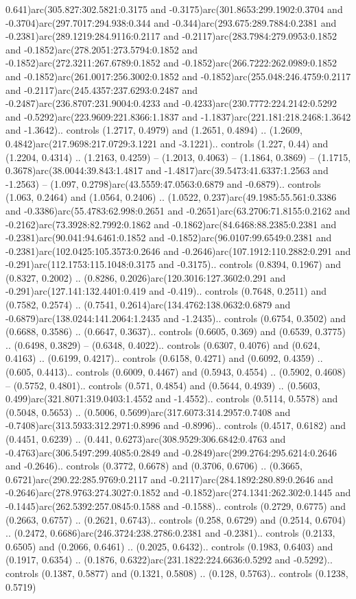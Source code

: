 0.641)arc(305.827:302.5821:0.3175 and -0.3175)arc(301.8653:299.1902:0.3704 and -0.3704)arc(297.7017:294.938:0.344 and -0.344)arc(293.675:289.7884:0.2381 and -0.2381)arc(289.1219:284.9116:0.2117 and -0.2117)arc(283.7984:279.0953:0.1852 and -0.1852)arc(278.2051:273.5794:0.1852 and -0.1852)arc(272.3211:267.6789:0.1852 and -0.1852)arc(266.7222:262.0989:0.1852 and -0.1852)arc(261.0017:256.3002:0.1852 and -0.1852)arc(255.048:246.4759:0.2117 and -0.2117)arc(245.4357:237.6293:0.2487 and -0.2487)arc(236.8707:231.9004:0.4233 and -0.4233)arc(230.7772:224.2142:0.5292 and -0.5292)arc(223.9609:221.8366:1.1837 and -1.1837)arc(221.181:218.2468:1.3642 and -1.3642).. controls (1.2717, 0.4979) and (1.2651, 0.4894) .. (1.2609, 0.4842)arc(217.9698:217.0729:3.1221 and -3.1221).. controls (1.227, 0.44) and (1.2204, 0.4314) .. (1.2163, 0.4259) -- (1.2013, 0.4063) -- (1.1864, 0.3869) -- (1.1715, 0.3678)arc(38.0044:39.843:1.4817 and -1.4817)arc(39.5473:41.6337:1.2563 and -1.2563) -- (1.097, 0.2798)arc(43.5559:47.0563:0.6879 and -0.6879).. controls (1.063, 0.2464) and (1.0564, 0.2406) .. (1.0522, 0.237)arc(49.1985:55.561:0.3386 and -0.3386)arc(55.4783:62.998:0.2651 and -0.2651)arc(63.2706:71.8155:0.2162 and -0.2162)arc(73.3928:82.7992:0.1862 and -0.1862)arc(84.6468:88.2385:0.2381 and -0.2381)arc(90.041:94.6461:0.1852 and -0.1852)arc(96.0107:99.6549:0.2381 and -0.2381)arc(102.0425:105.3573:0.2646 and -0.2646)arc(107.1912:110.2882:0.291 and -0.291)arc(112.1753:115.1048:0.3175 and -0.3175).. controls (0.8394, 0.1967) and (0.8327, 0.2002) .. (0.8286, 0.2026)arc(120.3016:127.3602:0.291 and -0.291)arc(127.141:132.4401:0.419 and -0.419).. controls (0.7648, 0.2511) and (0.7582, 0.2574) .. (0.7541, 0.2614)arc(134.4762:138.0632:0.6879 and -0.6879)arc(138.0244:141.2064:1.2435 and -1.2435).. controls (0.6754, 0.3502) and (0.6688, 0.3586) .. (0.6647, 0.3637).. controls (0.6605, 0.369) and (0.6539, 0.3775) .. (0.6498, 0.3829) -- (0.6348, 0.4022).. controls (0.6307, 0.4076) and (0.624, 0.4163) .. (0.6199, 0.4217).. controls (0.6158, 0.4271) and (0.6092, 0.4359) .. (0.605, 0.4413).. controls (0.6009, 0.4467) and (0.5943, 0.4554) .. (0.5902, 0.4608) -- (0.5752, 0.4801).. controls (0.571, 0.4854) and (0.5644, 0.4939) .. (0.5603, 0.499)arc(321.8071:319.0403:1.4552 and -1.4552).. controls (0.5114, 0.5578) and (0.5048, 0.5653) .. (0.5006, 0.5699)arc(317.6073:314.2957:0.7408 and -0.7408)arc(313.5933:312.2971:0.8996 and -0.8996).. controls (0.4517, 0.6182) and (0.4451, 0.6239) .. (0.441, 0.6273)arc(308.9529:306.6842:0.4763 and -0.4763)arc(306.5497:299.4085:0.2849 and -0.2849)arc(299.2764:295.6214:0.2646 and -0.2646).. controls (0.3772, 0.6678) and (0.3706, 0.6706) .. (0.3665, 0.6721)arc(290.22:285.9769:0.2117 and -0.2117)arc(284.1892:280.89:0.2646 and -0.2646)arc(278.9763:274.3027:0.1852 and -0.1852)arc(274.1341:262.302:0.1445 and -0.1445)arc(262.5392:257.0845:0.1588 and -0.1588).. controls (0.2729, 0.6775) and (0.2663, 0.6757) .. (0.2621, 0.6743).. controls (0.258, 0.6729) and (0.2514, 0.6704) .. (0.2472, 0.6686)arc(246.3724:238.2786:0.2381 and -0.2381).. controls (0.2133, 0.6505) and (0.2066, 0.6461) .. (0.2025, 0.6432).. controls (0.1983, 0.6403) and (0.1917, 0.6354) .. (0.1876, 0.6322)arc(231.1822:224.6636:0.5292 and -0.5292).. controls (0.1387, 0.5877) and (0.1321, 0.5808) .. (0.128, 0.5763).. controls (0.1238, 0.5719) 